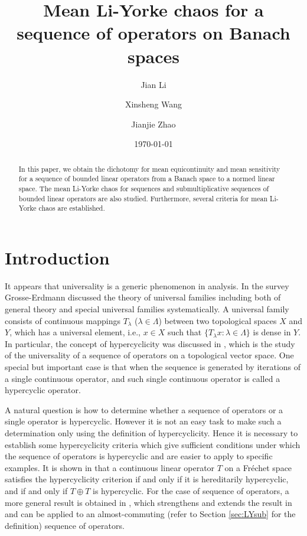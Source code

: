 \documentclass[12pt,a4paper]{amsart}
\title[M\MakeLowercase{ean} L\MakeLowercase{i}-Y\MakeLowercase{orke chaos for a sequence of operators on} B\MakeLowercase{anach spaces}] %
{M\MakeLowercase{ean} L\MakeLowercase{i}-Y\MakeLowercase{orke chaos for a sequence of operators on} B\MakeLowercase{anach spaces}}
\author[J. L\MakeLowercase{i}]{J\MakeLowercase{ian} Li}
\author[X. W\MakeLowercase{ang}]{X\MakeLowercase{insheng} Wang}
\author[J. Z\MakeLowercase{hao}]{J\MakeLowercase{ianjie} Zhao}
\date{\today}
\theoremstyle{definition}
\theoremstyle{plain}
\begin{document}
\begin{abstract}
In this paper, we obtain the dichotomy for mean equicontinuity and mean sensitivity for a sequence of bounded linear operators from a Banach space to a normed linear space.
The mean Li-Yorke chaos for sequences and submultiplicative sequences of bounded linear operators are also studied.
Furthermore, several criteria for mean Li-Yorke chaos are established.
\end{abstract}

\maketitle

\section{Introduction}

It appears that universality is a generic phenomenon in analysis. 
In the survey \cite{G1999} Grosse-Erdmann discussed the theory of universal families including both of general theory and special universal families systematically. 
A universal family consists of continuous mappings $T_\lambda$ ($\lambda\in\Lambda$) between two topological spaces $X$ and $Y$, which has a universal element, i.e., $x\in X$ such that $\{T_\lambda x\colon\lambda\in\Lambda\}$ is dense in $Y$. 
In particular, the concept of hypercyclicity was discussed in \cite{G1999}, which is the study of the universality of a sequence of operators on a topological vector space. 
One special but important case is that when the sequence is generated by iterations of a single continuous operator, and such single continuous operator is called a hypercyclic operator.

A natural question is how to determine whether a sequence of operators or a single operator is hypercyclic. However it is not an easy task to make such a determination only using the definition of hypercyclicity. 
Hence it is necessary to establish some hypercyclicity criteria which give sufficient conditions under which the sequence of operators is hypercyclic and are easier to apply to specific examples. 
It is shown in \cite{BP1999} that a continuous linear operator $T$ on a Fr\'echet space satisfies the hypercyclicity criterion if and only if it is hereditarily hypercyclic, and if and only if $T\oplus T$ is hypercyclic.
For the case of sequence of operators, a more general result is obtained in \cite{BG2003}, which strengthens and extends the result in \cite{BP1999} and can be applied to an almost-commuting (refer to Section \ref{sec:LYsub} for the definition) sequence of operators.
\end{document}
